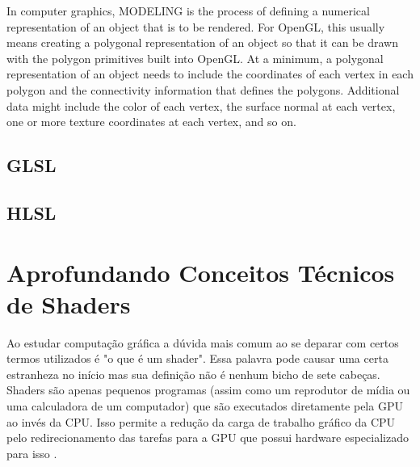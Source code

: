 In computer graphics, MODELING is the process of defining a numerical representation of an object that is to be rendered. For OpenGL, this usually means creating a polygonal representation of an object so that it can be drawn with the polygon primitives built into OpenGL. At a minimum, a polygonal representation of an object needs to include the coordinates of each vertex in each polygon and the connectivity information that defines the polygons. Additional data might include the color of each vertex, the surface normal at each vertex, one or more texture coordinates at each vertex, and so on.

\subsection{GLSL}
\label{sec:glsl}

\subsection{HLSL}
\label{sec:hlsl}


\section{Aprofundando Conceitos Técnicos de Shaders}
\label{sec:aprofundando-conceitos-tecnicos-shaders}

Ao estudar computação gráfica a dúvida mais comum ao se deparar com certos termos utilizados é "o que é um shader". Essa palavra pode causar uma certa estranheza no início mas sua definição não é nenhum bicho de sete cabeças. Shaders são apenas pequenos programas (assim como um reprodutor de mídia ou uma calculadora de um computador) que são executados diretamente pela \acrshort{GPU} ao invés da \acrshort{CPU}. Isso permite a redução da carga de trabalho gráfico da \acrshort{CPU} pelo redirecionamento das tarefas para a \acrshort{GPU} que possui hardware especializado para isso \cite{openGLBook}.

	\begin{figure}[h!]
		\centering
	\end{figure}
	\nocite{figura5}

